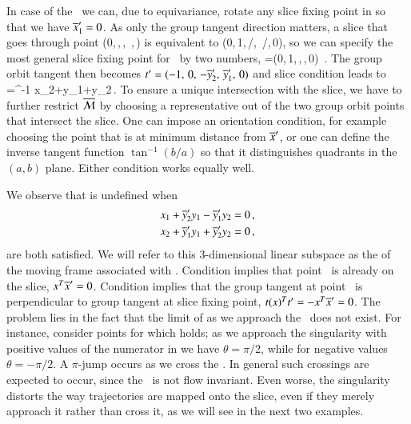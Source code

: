 \documentclass[preprint,number,sort&compress]{elsarticle}
\begin{document}
In case of the \cLe\ we can, due to equivariance, rotate any
slice fixing point in  so that we have
${\overline{x}'_{1}}=0$.
As only the group tangent direction matters, a slice that
goes through point
    (0,\,,\,,\,
       ,\,)
is equivalent to
    (0,\,1,\,/,\,
       /,\,0),
so we can specify the most general slice fixing point for
\cLe\ by two numbers,
\beq
\slicep=(0,\,1,\,,\,,\,0)
\,.
The group orbit tangent then becomes
$\sliceTan{}=(-1,\,0,\,-\slicepComp{y}{2},\,\slicepComp{y}{1},\,0)$
and slice condition  leads to
\beq
  \theta=\tan^{-1}
			  {x_2+y_1+y_2}\,.
To ensure a unique intersection with the slice, we have to
further restrict $\pSRed$ by choosing a representative out of
the two group orbit points that intersect the slice. One can
impose an orientation condition, for example choosing the
point that is at minimum distance from $\slicep$, or one can
define the inverse tangent function $\tan^{-1}({b}/{a})$ so
that it distinguishes quadrants in the $(a,b)$ plane. Either
condition works equally well.

We observe that  is undefined when
\begin{subequations}\label{cLeMFsing}
  \begin{align}
    x_1+\slicepComp{y}{2}y_1-\slicepComp{y}{1}y_2 &=0 \label{cLeMFsingOnSlice}\cont
    x_2+\slicepComp{y}{1}y_1+\slicepComp{y}{2}y_2 &=0 \label{cLeMFsingPerpTan}\,,
  \end{align}
\end{subequations}
are both satisfied. We will refer to this $3$-dimensional
linear subspace as the \emph{\sset} of the moving frame
associated with . Condition
 implies that point \ssp\ is already
on the slice, $x^T{\overline{x}'}=0$. Condition
 implies that the group tangent at
point \ssp\ is perpendicular to group tangent at slice fixing
point, $t{}(x)^Tt'_{}=-x^T{\overline{x}'}=0$. The
problem lies in the fact that the limit of 
as we approach the \sset\ does not exist. For instance,
consider points for which  holds; as
we approach the singularity with positive values of the
numerator in  we have $\theta=\pi/2$, while for
negative values $\theta=-\pi/2$. A $\pi$-jump occurs as we
cross the \sset. In general such crossings are expected to
occur, since the \sset\ is not flow in\-vari\-ant. Even
worse, the singularity distorts the way trajectories are
mapped onto the slice, even if they merely approach it rather
than cross it, as we will see in the next two examples.
\end{document}

